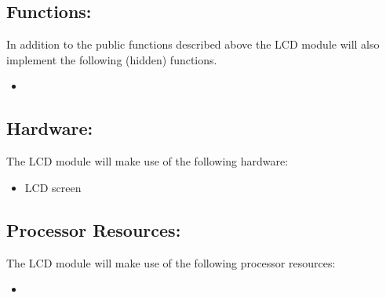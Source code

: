 \documentclass[]{article}
\begin{document}
\subsection{Functions:}
In addition to the public functions described above the LCD module will also implement the following (hidden) functions.
\begin{itemize}
	\item 
\end{itemize}

\subsection{Hardware:}
The LCD module will make use of the following hardware:
\begin{itemize}
	\item LCD screen
\end{itemize}

\subsection{Processor Resources:}
The LCD module will make use of the following processor resources:
\begin{itemize}
	\item 
\end{itemize}
\end{document}
